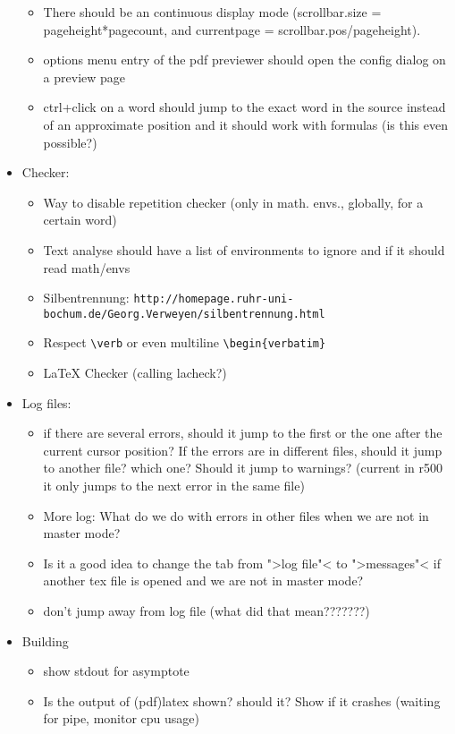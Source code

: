 \documentclass[10pt,a4paper,portrait]{article}
\begin{document}
\begin{itemize}
\begin{itemize}
	\item There should be an continuous display mode (scrollbar.size = pageheight*pagecount, and currentpage = scrollbar.pos/pageheight).
	\item options menu entry of the pdf previewer should open the config dialog on a preview page
	\item ctrl+click on a word should jump to the exact word in the source instead of an approximate position and it should work with formulas (is this even possible?)
	\end{itemize}
	\item  Checker: \begin{itemize}
		\item Way to disable repetition checker (only in math. envs., globally, for a certain word)
		\item Text analyse should have a list of environments to ignore and if it should read math/envs
		\item Silbentrennung: \verb+http://homepage.ruhr-uni-bochum.de/Georg.Verweyen/silbentrennung.html+
		\item Respect \verb+\verb+ or even multiline \verb+\begin{verbatim}+
		\item LaTeX Checker	(calling lacheck?)
	\end{itemize}
	\item Log files:\begin{itemize}
	\item if there are several errors, should it jump to the first or the one after the current cursor position? If the errors are in different files, should it jump to another file? which one? Should it jump to warnings? 	(current in r500 it only jumps to the next error in the same file) 
		\item More log: What do we do with errors in other files when we are not in master mode? 
		\item Is it a good idea to change the tab from ">log file"< to ">messages"< if another tex file is opened and we are not in master mode?
		\item don't jump away from log file (what did that mean???????)
	\end{itemize}
	\item Building \begin{itemize}
     	\item show stdout for asymptote
		\item Is the output of (pdf)latex shown? should it? Show if it crashes (waiting for pipe, monitor cpu usage)

\end{itemize}
\end{itemize}
\end{document}
